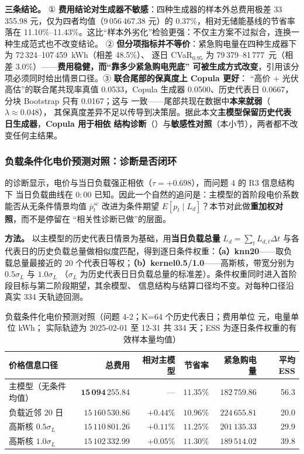 \textbf{三条结论。} ① \textbf{费用结论对生成器不敏感}：四种生成器的样本外总费用极差
33\,355.98 元，仅为四者均值（9\,056\,467.38 元）的 0.37\%，相对无储能基线的节省率落在
11.10\%--11.43\%。这比“样本外劣化”检验更强：不仅主方案不过拟合，连换一种生成范式也不改变结论。
② \textbf{但分项指标并不等价}：紧急购电量在四种生成器下为 72\,324--107\,459~kWh（相差 48.5\%）、
逐日 CVaR\(_{0.95}\) 为 79\,379--81\,777~元（相差 3.0\%）——\textbf{费用稳健，而“靠多少紧急购电兜底”
可被生成方式改变}，引用该分项必须同时给出情景口径。③ \textbf{联合尾部的保真度上 Copula 更好}：
“高价 \(+\) 光伏高估”的联合尾共现率真值 0.0533，Copula 生成器 0.0500、历史代表日 0.0667，分块
Bootstrap 只有 0.0167；这与  一致——尾部共现在数据中\textbf{本来就弱}（\(\lambda\approx0.048\)），
其保真度差异不足以传导到决策层。据此本文\textbf{主模型保留历史代表日生成器}，\textbf{Copula 用于相依
结构诊断}（）与\textbf{敏感性对照}（本小节），两者都不改变任何主结果。

\subsubsection{负载条件化电价预测对照：诊断是否闭环}
\label{sec:q4-pricecond}

 的诊断显示，电价与当日负载强正相依（\(\tau=+0.698\)），而问题 4 的 R3 信息结构下
当日负载曲线在 \(0{:}00\) 已知。因此一个自然的追问是：主模型的首阶段电价系数能否从无条件情景均值
\(\bar p^{sc}_t\) 改进为条件期望 \(E[p_t\mid L_d]\)？本节对此做\textbf{重加权对照}，而不是停留在
“相关性诊断已做”的层面。

\textbf{方法。} 以主模型的历史代表日情景为基础，用\textbf{当日负载总量} \(L_d=\sum_t L_{d,t}\Delta t\)
与各代表日的历史负载总量做相似度匹配，得到逐日条件权重：\textbf{（a）knn20}——取负载总量最接近的
20 个代表日等权；\textbf{（b）kernel0.5/1.0}——高斯核，带宽分别为 \(0.5\sigma_L\) 与 \(1.0\sigma_L\)
（\(\sigma_L\) 为历史代表日日负载总量的标准差）。条件权重同时进入首阶段目标与第二阶段期望，其余模型、
信息结构与结算口径均不变。对每种口径沿真实 334 天轨迹回测。

\begin{table}[htbp]
  \centering
  \caption{负载条件化电价预测对照（问题 4-2；K=64 个历史代表日；费用单位 元，电量单位 kWh；
           实际轨迹为 2025-02-01 至 12-31 共 334 天；ESS 为逐日条件权重的有效样本量均值）}
  \label{tab:pricecond}
  \small
  \begin{tabular}{lrrrrr}
    \toprule
    价格信息口径 & 总费用 & 相对主模型 & 节省率 & 紧急购电量 & 平均 ESS \\
    \midrule
    主模型（无条件均值） & $\mathbf{15\,094\,255.84}$ & — & $\mathbf{11.35\%}$ & $182\,759.86$ & 56.3 \\
    负载近邻 20 日 & $15\,160\,530.86$ & $+0.44\%$ & $10.96\%$ & $224\,655.81$ & 20.0 \\
    高斯核 $0.5\sigma_L$ & $15\,110\,801.26$ & $+0.11\%$ & $11.25\%$ & $201\,135.33$ & 29.9 \\
    高斯核 $1.0\sigma_L$ & $15\,102\,332.99$ & $+0.05\%$ & $11.30\%$ & $189\,514.02$ & 39.8 \\
    \bottomrule
  \end{tabular}
\end{table}

